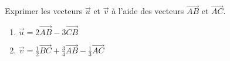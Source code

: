 
Exprimer les vecteurs $\vec{u}$ et $\vec{v}$ à l'aide des vecteurs $\overrightarrow{AB}$ et $\overrightarrow{AC}$.
\begin{enumerate}
\item $\vec{u}=2\overrightarrow{AB}-3\overrightarrow{CB}$
\item $\vec{v}=\frac{1}{2}\overrightarrow{BC}+ \frac{3}{4}\overrightarrow{AB}- \frac{1}{3}\overrightarrow{AC}$
\end{enumerate}